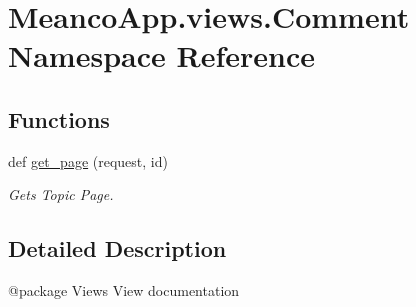 \hypertarget{namespace_meanco_app_1_1views_1_1_comment}{}\section{Meanco\+App.\+views.\+Comment Namespace Reference}
\label{namespace_meanco_app_1_1views_1_1_comment}
\subsection*{Functions}
\begin{DoxyCompactItemize}
\item 
\hypertarget{namespace_meanco_app_1_1views_1_1_comment_a15f6da6fd0f8db5344e7060322b5831a}{}\label{namespace_meanco_app_1_1views_1_1_comment_a15f6da6fd0f8db5344e7060322b5831a} 
def \hyperlink{namespace_meanco_app_1_1views_1_1_comment_a15f6da6fd0f8db5344e7060322b5831a}{get\+\_\+page} (request, id)
\begin{DoxyCompactList}\small\item\em Gets Topic Page. \end{DoxyCompactList}\end{DoxyCompactItemize}


\subsection{Detailed Description}
\begin{DoxyVerb}@package Views
View documentation\end{DoxyVerb}
 
